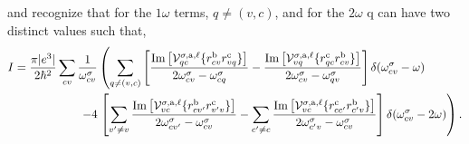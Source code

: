 and recognize that for the $1\omega$ terms, $q\neq (v,c)$, and for the 
$2\omega$ q can have two distinct values such that,
\begin{align*}  
I = \frac{\pi|e^3|}{2\hbar^2}\sum_{cv}\frac{1}{\omega^\sigma_{cv}}
&\left(
\sum_{q\neq (v,c)}
\left[
 \frac{\mathrm{Im}\left[\mathcal{V}^{\sigma,\text{a},\ell}_{qc}
        \{r^{\text{b}}_{cv}
        r^{\text{c}}_{vq}\}\right]}
        {2\omega^\sigma_{cv}-\omega^\sigma_{cq}}
 -\frac{\mathrm{Im}\left[\mathcal{V}^{\sigma,\text{a},\ell}_{vq}
        \{r^{\text{c}}_{qc}
        r^{\text{b}}_{cv}\}\right]}
        {2\omega^\sigma_{cv}-\omega^\sigma_{qv}}
\right]\delta(\omega^{\sigma}_{cv}-\omega)\right.\nonumber\\
-
4&\left.\left[
 \sum_{v^{\prime}\neq v}
  \frac{\mathrm{Im}\left[\mathcal{V}^{\sigma,\text{a},\ell}_{vc}
        \{r^{\text{b}}_{cv^{\prime}}
        r^{\text{c}}_{v^{\prime}v}\}\right]}
        {2\omega^\sigma_{cv^{\prime}}-\omega^\sigma_{cv}}
 -\sum_{c^{\prime}\neq c}
 \frac{\mathrm{Im}\left[\mathcal{V}^{\sigma,\text{a},\ell}_{vc}
        \{r^{\text{c}}_{cc^{\prime}}
        r^{\text{b}}_{c^{\prime}v}\}\right]}
        {2\omega^\sigma_{c^{\prime}v}-\omega^\sigma_{cv}}
\right]\delta(\omega^{\sigma}_{cv}-2\omega)\right)
.
\end{align*}
 
